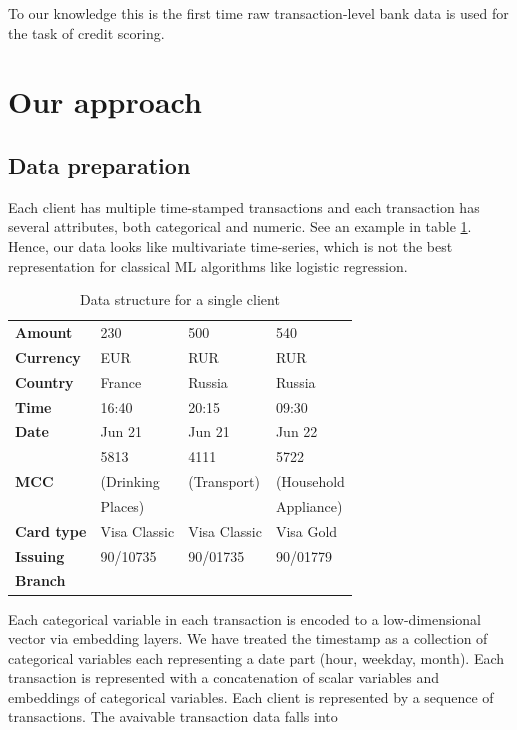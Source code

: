 \documentclass{sigkddExp}
\begin{document}
To our knowledge this is the first time raw transaction-level bank data is used for the task of credit scoring. 

\section{Our approach}
\subsection{Data preparation}


Each client has multiple time-stamped transactions and each transaction has several attributes, both categorical and numeric. See an example in table \ref{tab1}. Hence, our data looks like multivariate time-series, which is not the best representation for classical ML algorithms like logistic regression.

\begin{table}
\caption{Data structure for a single client}
\begin{tabular}{ | l |  l l l | }
\hline
\textbf{Amount} & 230 & 500 & 540 \\
\textbf{Currency} & EUR & RUR & RUR \\
\textbf{Country} & France & Russia & Russia \\
\textbf{Time} & 16:40 & 20:15 & 09:30 \\
\textbf{Date} & Jun 21 & Jun 21 & Jun 22 \\
 & 5813 & 4111 & 5722 \\
\textbf{MCC} & (Drinking & (Transport) & (Household \\
 & Places) &  & Appliance) \\
\textbf{Card type} & Visa Classic & Visa Classic & Visa Gold \\
\textbf{Issuing} & 90/10735 & 90/01735 & 90/01779 \\
\textbf{Branch} &&& \\
\hline
\end{tabular}
\label{tab1}
\end{table}

Each categorical variable in each transaction is encoded to a low-dimensional vector via embedding layers. We have treated the timestamp as a collection of categorical variables each representing a date part (hour, weekday, month). Each transaction is represented with a concatenation of scalar variables and embeddings of categorical variables. Each client is represented by a sequence of transactions.
The avaivable transaction data falls into 
\end{document}

